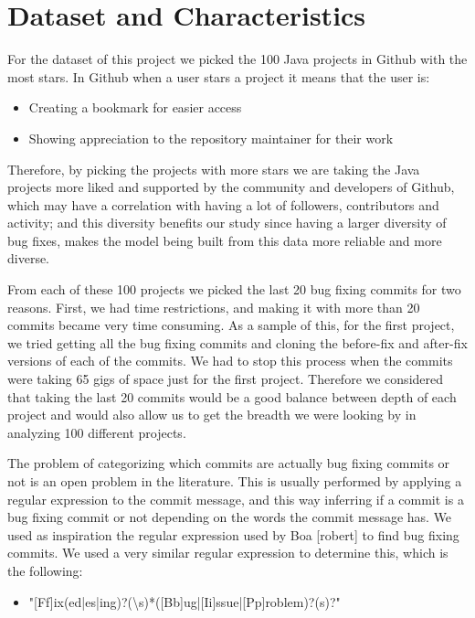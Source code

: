 \documentclass{sig-alternate-05-2015}
\begin{document}
\section{Dataset and Characteristics}
For the dataset of this project we picked the 100 Java projects in Github with the most stars. In Github when a user stars a project it means that the user is:
\begin{itemize}
  \item Creating a bookmark for easier access
  \item Showing appreciation to the repository maintainer for their work
\end{itemize}

Therefore, by picking the projects with more stars we are taking the Java projects more liked and supported by the community and developers of Github, which may have a correlation with having a lot of followers, contributors and activity; and this diversity benefits our study since having a larger diversity of bug fixes, makes the model being built from this data more reliable and more diverse.

From each of these 100 projects we picked the last 20 bug fixing commits for two reasons. First, we had time restrictions, and making it with more than 20 commits became very time consuming. As a sample of this, for the first project, we tried getting all the bug fixing commits and cloning the before-fix and after-fix versions of each of the commits. We had to stop this process when the commits were taking 65 gigs of space just for the first project. Therefore we considered that taking the last 20 commits would be a good balance between depth of each project and would also allow us to get the breadth we were looking by in analyzing 100 different projects. 

The problem of categorizing which commits are actually bug fixing commits or not is an open problem in the literature. This is usually performed by applying a regular expression to the commit message, and this way inferring if a commit is a bug fixing commit or not depending on the words the commit message has. We used as inspiration the regular expression used by Boa [robert] to find bug fixing commits. We used a very similar regular expression to determine this, which is the following:
\begin{itemize}
  \item "[Ff]ix(ed|es|ing)?(\textbackslash s)*([Bb]ug|[Ii]ssue|[Pp]roblem)?(s)?"
\end{itemize}
\end{document}
